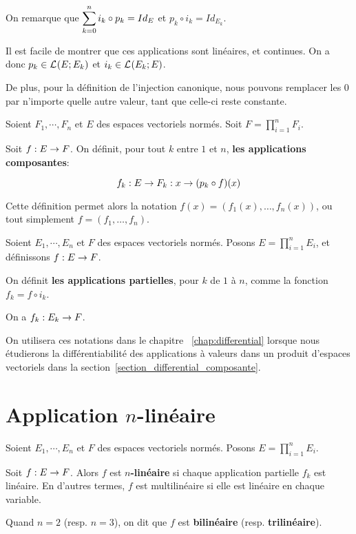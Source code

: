 On remarque que $\displaystyle \sum_{k = 0}^{n} i_{k} \circ p_{k} = Id_{E}$ et $p_{k} \circ
i_{k} = Id_{E_{k}}$.

Il est facile de montrer que ces applications sont linéaires, et continues.
On a donc $p_{k} \in \mathcal{L}_{}(E; E_{k})$ et $i_{k} \in
\mathcal{L}_{}(E_{k}; E)$.

De plus, pour la définition de l'injection canonique, nous pouvons remplacer les
$0$ par n'importe quelle autre valeur, tant que celle-ci reste constante.

\begin{definition} 
	\label{composante_function}
	Soient $F_{1}, \cdots, F_{n}$ et $E$ des espaces vectoriels normés.
	Soit $F = \displaystyle \prod_{i = 1}^{n} F_{i}$.

	Soit $f : E \rightarrow F$. On définit, pour tout $k$ entre $1$ et $n$,
	\textbf{les applications composantes}:

	\begin{equation*}
		f_{k} : E \rightarrow F_{k} : x \rightarrow (p_{k} \circ f) (x)
	\end{equation*}
\end{definition}

Cette définition permet alors la notation $f(x) = (f_{1}(x), \ldots, f_{n}(x))$,
ou tout simplement $f = (f_{1}, \ldots, f_{n})$.

\begin{definition} 
	\label{partial_application}
	Soient $E_{1}, \cdots, E_{n}$ et $F$ des espaces vectoriels normés.
	Posons $E = \displaystyle \prod_{i = 1}^{n} E_{i}$, et définissons
	$f : E \rightarrow F$.

	On définit \textbf{les applications partielles}, pour $k$ de $1$ à
	$n$, comme la fonction $f_{k} = f \circ i_{k}$.

	On a $f_{k} : E_{k} \rightarrow F$.
\end{definition}

On utilisera ces notations dans le chapitre ~\ref{chap:differential} lorsque nous
étudierons la différentiabilité des applications à valeurs dans un produit
d'espaces vectoriels dans la section~\ref{section_differential_composante}.

\section{Application $n$-linéaire}

\begin{definition}
	Soient $E_{1}, \cdots, E_{n}$ et $F$ des espaces vectoriels normés. Posons
	$E = \displaystyle \prod_{i = 1}^{n} E_{i}$.

	Soit $f : E \rightarrow F$. Alors $f$ est \textbf{$n$-linéaire} si chaque
	application partielle $f_{k}$ est linéaire. En d'autres termes, $f$ est
	multilinéaire si elle est linéaire en chaque variable.

	Quand $n = 2$ (resp. $n = 3$), on dit que $f$ est \textbf{bilinéaire} (resp.
	\textbf{trilinéaire}).
\end{definition}

